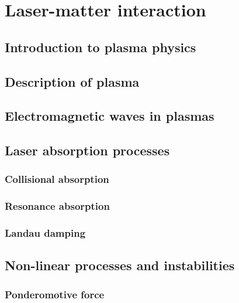 \documentclass[12pt, twoside, a4paper, openright]{report}
\begin{document}

\chapter{Laser-matter interaction}


\section{Introduction to plasma physics}


\section{Description of plasma}


\section{Electromagnetic waves in plasmas}


\section{Laser absorption processes}


\subsection{Collisional absorption}


\subsection{Resonance absorption}


\subsection{Landau damping}


\section{Non-linear processes and instabilities}


\subsection{Ponderomotive force}

\end{document}
